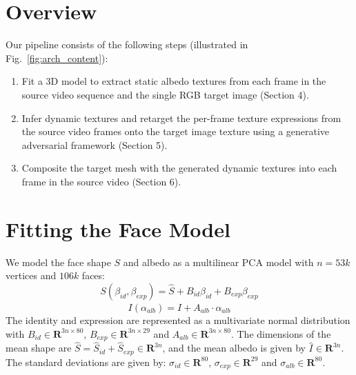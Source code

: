 \section{Overview}






Our pipeline consists of the following steps (illustrated in Fig.~\ref{fig:arch_content}):

\begin{enumerate}
\item Fit a 3D model to extract static albedo textures from each frame in the source video sequence and the single RGB target image (Section 4).
\item Infer dynamic textures and retarget the per-frame texture expressions from the source video frames onto the target image texture using a generative adversarial framework (Section 5).
\item Composite the target mesh with the generated dynamic textures into each frame in the source video (Section 6).
\end{enumerate}


\section{Fitting the Face Model}


We model the face shape $S$ and albedo as a multilinear PCA model with $n = 53k$ vertices and $106k$ faces:
\begin{equation}
S(\beta_{id}, \beta_{exp}) = \hat{S} + B_{id}\beta_{id} + B_{exp} \beta_{exp}
\end{equation}
\begin{equation}
I(\alpha_{alb}) = \hat{I} + A_{alb} \cdot \alpha_{alb}
\end{equation}
The identity and expression are represented as a multivariate normal distribution with $B_{id} \in \mathbf{R}^{3n \times 80} $, $B_{exp} \in \mathbf{R}^{3n \times 29}$ and $A_{alb} \in \mathbf{R}^{3n \times 80}$.  The dimensions of the mean shape are $\hat{S} = \hat{S}_{id} + \hat{S}_{exp} \in \mathbf{R}^{3n}$, and the mean albedo is given by $\hat{I} \in \mathbf{R}^{3n}$.  The standard deviations are given by: $\sigma_{id} \in \mathbf{R}^{80}$, $\sigma_{exp} \in \mathbf{R}^{29}$ and $\sigma_{alb} \in \mathbf{R}^{80}$.

